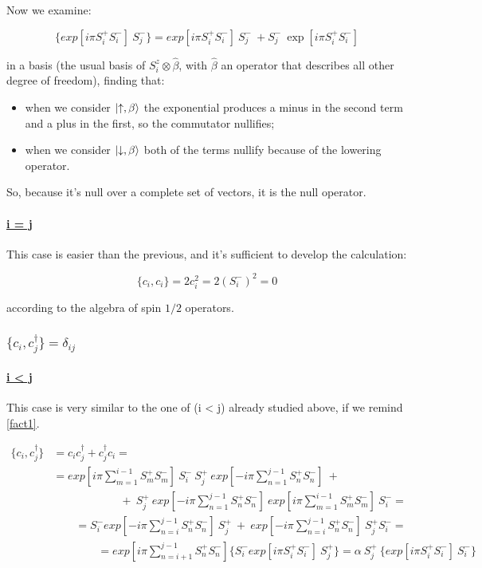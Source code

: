 Now we examine:

\begin{equation*}
\{exp[i\pi S_i^+ S_i^-]~S_j^-\} = exp[i\pi S_i^+ S_i^-]~S_j^-\ + S_j^-~\exp[i\pi S_i^+ S_i^-]
\end{equation*}

\noindent in a basis (the usual basis of $S_i^z \otimes \hat{\beta}$, with $\hat{\beta}$ an operator that describes all other degree of freedom), finding that:
\begin{itemize}
	\item when we consider $\ket{\uparrow, \beta}$ the exponential produces a minus in the second term and a plus in the first, so the commutator nullifies;
	\item when we consider $\ket{\downarrow, \beta}$ both of the terms nullify because of the lowering operator.
\end{itemize}

So, because it's null over a complete set of vectors, it is the null operator.

\paragraph{\underline{i = j}} This case is easier than the previous, and it's sufficient to develop the calculation:

\begin{equation*}
\{c_i, c_i\} = 2 c_i^2 = 2 (S_i^-)^2 = 0
\end{equation*}

\noindent according to the algebra of spin $1/2$ operators.

\subsubsection{$\{c_i, c_j^\dagger\} = \delta_{ij}$}

\paragraph{\underline{i < j}} This case is very similar to the one of (i < j) already studied above, if we remind \cref{fact1}.

\begin{align*}
\{c_i, c_j^\dagger\} &= c_i c_j^\dagger + c_j^\dagger c_i =\\
&= exp[i\pi \sum_{m=1}^{i-1} S_m^+ S_m^-]~S_i^- ~S_j^+ ~exp[-i\pi \sum_{n=1}^{j-1} S_n^+ S_n^-] ~+\\
&\qquad \qquad \qquad +~ S_j^+ ~exp[-i\pi \sum_{n=1}^{j-1} S_n^+ S_n^-]~ exp[i\pi \sum_{m=1}^{i-1} S_m^+ S_m^-]~S_i^- =\\
& \qquad  = S_i^- exp[- i\pi \sum_{n=i}^{j-1} S_n^+ S_n^-]~S_j^+ ~+~ exp[- i\pi \sum_{n=i}^{j-1} S_n^+ S_n^-]~S_j^+ S_i^- =\\
& \qquad \qquad = exp[i\pi \sum_{n=i+1}^{j-1} S_n^+ S_n^-] \{S_i^- exp[i\pi S_i^+ S_i^-]~S_j^+\} = \alpha ~S_j^+ ~\{exp[i\pi S_i^+ S_i^-]~S_i^-\}
\end{align*}

